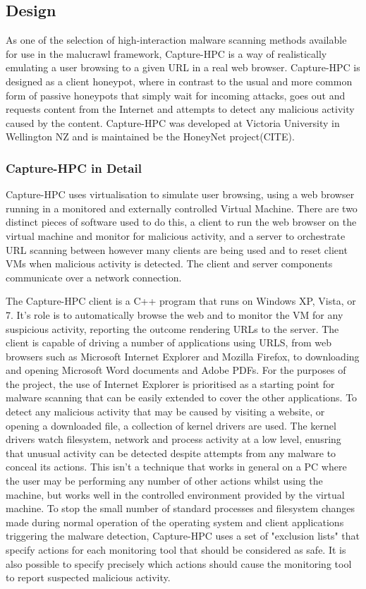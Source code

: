 \subsection{Design}

As one of the selection of high-interaction malware scanning
methods available for use in the malucrawl framework,
Capture-HPC\cite{capture-hpc} is a way of
realistically emulating a user browsing to a given URL in a real web browser.
Capture-HPC is designed as a client honeypot, where in contrast to the usual and
more common form of passive honeypots that simply wait for incoming attacks,
goes out and requests content from the Internet and attempts to detect any
malicious activity caused by the content. Capture-HPC was developed at Victoria
University in Wellington NZ and is maintained be the HoneyNet project(CITE).

\subsubsection{Capture-HPC in Detail}

Capture-HPC uses virtualisation to simulate user browsing, using a web browser
running in a monitored and externally controlled Virtual Machine. There are two
distinct pieces of software used to do this, a client to run the web browser on
the virtual machine and monitor for malicious activity, and a server to
orchestrate URL scanning between however many clients are being used and to
reset client VMs when malicious activity is detected. The client and server
components communicate over a network connection.

The Capture-HPC client is a C++ program that runs on Windows XP, Vista, or 7.
It's role is to automatically browse the web and to monitor the VM for any
suspicious activity, reporting the outcome rendering URLs to the server. The
client is capable of driving a number of applications using URLS, from web
browsers such as Microsoft Internet Explorer and Mozilla Firefox, to downloading and opening
Microsoft Word documents and Adobe PDFs. For the purposes of the project, the
use of Internet Explorer is prioritised as a starting point for malware scanning
that can be easily extended to cover the other applications. To detect any
malicious activity that may be caused by visiting a website, or opening a
downloaded file, a collection of kernel drivers are used. The kernel drivers
watch filesystem, network and process activity at a low level, enusring that
unusual activity can be detected despite attempts from any malware to conceal
its actions. This isn't a technique that works in general on a PC where the user
may be performing any number of other actions whilst using the machine, but
works well in the controlled environment provided by the virtual machine. To
stop the small number of standard processes and filesystem changes made during
normal operation of the operating system and client applications triggering the
malware detection, Capture-HPC uses a set of "exclusion lists" that specify
actions for each monitoring tool that should be considered as safe. It is also
possible to specify precisely which actions should cause the monitoring tool to
report suspected malicious activity.

